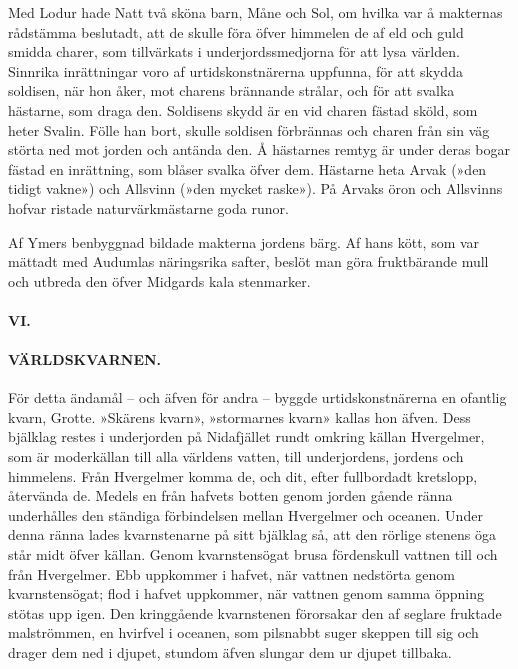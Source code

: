\protect\hypertarget{lb1625905.xhtmlux5cux23start10}{}{}\protect\hypertarget{lb1625905.xhtmlux5cux23start10-a}{}{}\protect\hypertarget{lb1625905.xhtmlux5cux23start10-b}{}{}\protect\hypertarget{lb1625905.xhtmlux5cux23start10-c}{}{}\protect\hypertarget{lb1625905.xhtmlux5cux23start10-d}{}{}

Med Lodur hade Natt två sköna barn, Måne och Sol, om hvilka var å
makternas rådstämma beslutadt, att de skulle föra öfver himmelen de af
eld och guld smidda charer, som tillvärkats i underjordssmedjorna för
att lysa världen. Sinnrika inrättningar voro af urtidskonstnärerna
uppfunna, för att skydda soldisen, när hon åker, mot charens brännande
strålar, och för att svalka hästarne, som draga den. Soldisens skydd är
en vid charen fästad sköld, som heter Svalin. Fölle han bort, skulle
soldisen förbrännas och charen från sin väg störta ned mot jorden och
antända den. Å hästarnes remtyg är under deras bogar fästad en
inrättning, som blåser svalka öfver dem. Hästarne heta Arvak (»den
tidigt vakne») och Allsvinn (»den mycket raske»). På Arvaks öron och
Allsvinns hofvar ristade naturvärkmästarne goda runor.

Af Ymers benbyggnad bildade makterna jordens bärg. Af hans kött, som var
mättadt med Audumlas näringsrika safter, beslöt man göra fruktbärande
mull och utbreda den öfver Midgards kala stenmarker.

\paragraph{VI.}

\paragraph{VÄRLDSKVARNEN.}

För detta ändamål -- och äfven för andra -- byggde urtidskonstnärerna en
ofantlig kvarn, Grotte. »Skärens kvarn», »stormarnes kvarn» kallas hon
äfven. Dess bjälklag restes i underjorden på Nidafjället rundt omkring
källan Hvergelmer, som är moderkällan till alla världens vatten, till
underjordens, jordens och himmelens. Från Hvergelmer komma de, och dit,
efter fullbordadt kretslopp, återvända de. Medels en från hafvets botten
genom jorden gående ränna underhålles den ständiga förbindelsen mellan
Hvergelmer och oceanen. Under denna ränna lades kvarnstenarne på sitt
bjälklag så, att den rörlige stenens öga står midt öfver källan. Genom
kvarnstensögat brusa fördenskull vattnen till och från Hvergelmer. Ebb
uppkommer i hafvet, när vattnen nedstörta
\protect\hypertarget{lb1625905.xhtmlux5cux23start11}{}{}\protect\hypertarget{lb1625905.xhtmlux5cux23start11-a}{}{}\protect\hypertarget{lb1625905.xhtmlux5cux23start11-b}{}{}\protect\hypertarget{lb1625905.xhtmlux5cux23start11-c}{}{}\protect\hypertarget{lb1625905.xhtmlux5cux23start11-d}{}{}
genom kvarnstensögat; flod i hafvet uppkommer, när vattnen genom samma
öppning stötas upp igen. Den kringgående kvarnstenen förorsakar den af
seglare fruktade malströmmen, en hvirfvel i oceanen, som pilsnabbt suger
skeppen till sig och drager dem ned i djupet, stundom äfven slungar dem
ur djupet tillbaka.

